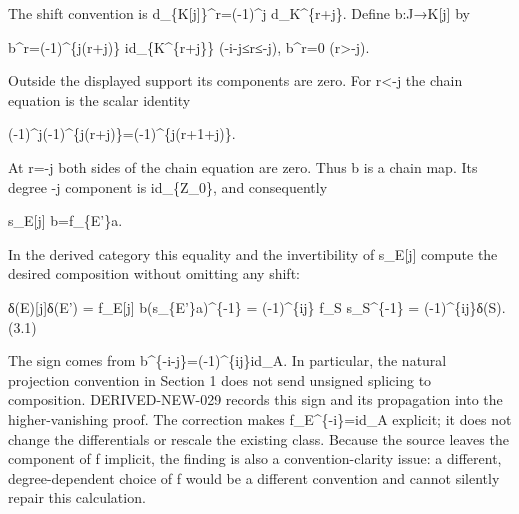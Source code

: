 \documentclass[11pt]{article}
\begin{document}
The shift convention is d\_\allowbreak{}\{K[j]\allowbreak{}\}\textasciicircum{}r\allowbreak{}=(-1)\allowbreak{}\textasciicircum{}j d\_\allowbreak{}K\textasciicircum{}\{r\allowbreak{}+j\}. Define b:\allowbreak{}J\allowbreak{}→K[j]\allowbreak{} by

b\textasciicircum{}r\allowbreak{}=(-1)\allowbreak{}\textasciicircum{}\{j(r\allowbreak{}+j)\allowbreak{}\} id\_\allowbreak{}\{K\textasciicircum{}\{r\allowbreak{}+j\}\} (-i-j≤r≤-j)\allowbreak{},\allowbreak{} b\textasciicircum{}r\allowbreak{}=0 (r>-j)\allowbreak{}.

Outside the displayed support its components are zero. For r\textless-j the chain equation is the scalar identity

(-1)\allowbreak{}\textasciicircum{}j(-1)\allowbreak{}\textasciicircum{}\{j(r\allowbreak{}+j)\allowbreak{}\}\allowbreak{}=(-1)\allowbreak{}\textasciicircum{}\{j(r\allowbreak{}+1\allowbreak{}+j)\allowbreak{}\}.

At r\allowbreak{}=-j both sides of the chain equation are zero. Thus b is a chain map. Its degree -j component is id\_\allowbreak{}\{Z\_\allowbreak{}0\},\allowbreak{} and consequently

s\_\allowbreak{}E[j]\allowbreak{} b\allowbreak{}=f\_\allowbreak{}\{E'\}a.

In the derived category this equality and the invertibility of s\_\allowbreak{}E[j]\allowbreak{} compute the desired composition without omitting any shift:\allowbreak{}

δ(E)\allowbreak{}[j]\allowbreak{}δ(E')\allowbreak{} \allowbreak{}= f\_\allowbreak{}E[j]\allowbreak{} b(s\_\allowbreak{}\{E'\}a)\allowbreak{}\textasciicircum{}\{-1\} \allowbreak{}= (-1)\allowbreak{}\textasciicircum{}\{ij\} f\_\allowbreak{}S s\_\allowbreak{}S\textasciicircum{}\{-1\} \allowbreak{}= (-1)\allowbreak{}\textasciicircum{}\{ij\}δ(S)\allowbreak{}. (3.1)\allowbreak{}

The sign comes from b\textasciicircum{}\{-i-j\}\allowbreak{}=(-1)\allowbreak{}\textasciicircum{}\{ij\}id\_\allowbreak{}A. In particular,\allowbreak{} the natural projection convention in Section 1 does not send unsigned splicing to composition. DERIVED-NEW-029 records this sign and its propagation into the higher-vanishing proof. The correction makes f\_\allowbreak{}E\textasciicircum{}\{-i\}\allowbreak{}=id\_\allowbreak{}A explicit; it does not change the differentials or rescale the existing class. Because the source leaves the component of f implicit,\allowbreak{} the finding is also a convention-clarity issue:\allowbreak{} a different,\allowbreak{} degree-dependent choice of f would be a different convention and cannot silently repair this calculation.
\end{document}
